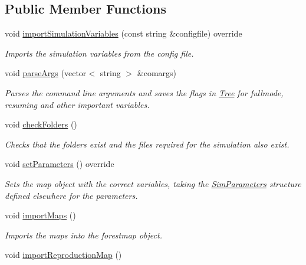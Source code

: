\subsection*{Public Member Functions}
\begin{DoxyCompactItemize}
\item 
void \hyperlink{class_spatial_tree_ac5fc862af2ca6f2b4c471c450093fcae}{import\+Simulation\+Variables} (const string \&configfile) override
\begin{DoxyCompactList}\small\item\em Imports the simulation variables from the config file. \end{DoxyCompactList}\item 
void \hyperlink{class_spatial_tree_ad6a5412bccbccc92a302b2fb05bbced2}{parse\+Args} (vector$<$ string $>$ \&comargs)
\begin{DoxyCompactList}\small\item\em Parses the command line arguments and saves the flags in \hyperlink{class_tree}{Tree} for fullmode, resuming and other important variables. \end{DoxyCompactList}\item 
void \hyperlink{class_spatial_tree_aef0097abc7c616ed656e26b4055834c3}{check\+Folders} ()\hypertarget{class_spatial_tree_aef0097abc7c616ed656e26b4055834c3}{}\label{class_spatial_tree_aef0097abc7c616ed656e26b4055834c3}

\begin{DoxyCompactList}\small\item\em Checks that the folders exist and the files required for the simulation also exist. \end{DoxyCompactList}\item 
void \hyperlink{class_spatial_tree_a0c83bcd9a84f4fa98c78b75a78a9a012}{set\+Parameters} () override
\begin{DoxyCompactList}\small\item\em Sets the map object with the correct variables, taking the \hyperlink{struct_sim_parameters}{Sim\+Parameters} structure defined elsewhere for the parameters. \end{DoxyCompactList}\item 
void \hyperlink{class_spatial_tree_ab9603c25cd1c8466d1e4bfa3f73f191f}{import\+Maps} ()
\begin{DoxyCompactList}\small\item\em Imports the maps into the forestmap object. \end{DoxyCompactList}\item 
void \hyperlink{class_spatial_tree_a5d9f29a12f8b66798139c89f153130db}{import\+Reproduction\+Map} ()\hypertarget{class_spatial_tree_a5d9f29a12f8b66798139c89f153130db}{}\label{class_spatial_tree_a5d9f29a12f8b66798139c89f153130db}


\end{DoxyCompactItemize}

